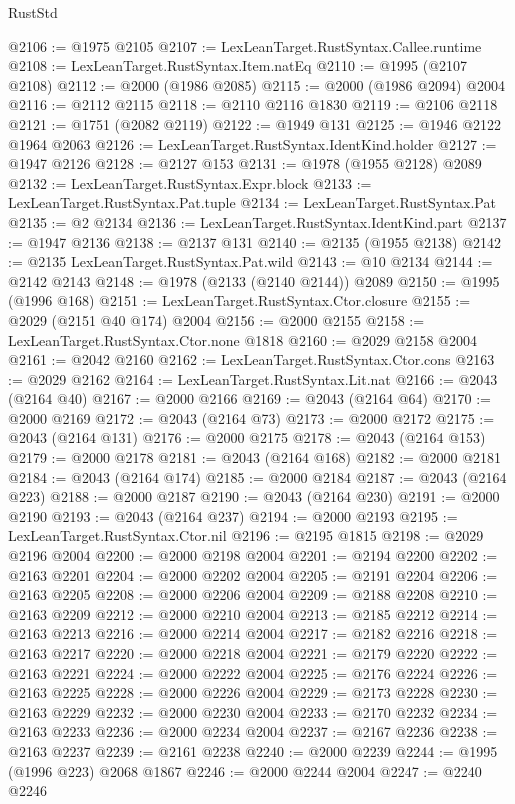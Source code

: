 \begin{lexlean}{RustStd}
\begin{coremodule}
@2106 := @1975 @2105
@2107 := LexLeanTarget.RustSyntax.Callee.runtime
@2108 := LexLeanTarget.RustSyntax.Item.natEq
@2110 := @1995 (@2107 @2108)
@2112 := @2000 (@1986 @2085)
@2115 := @2000 (@1986 @2094) @2004
@2116 := @2112 @2115
@2118 := @2110 @2116 @1830
@2119 := @2106 @2118
@2121 := @1751 (@2082 @2119)
@2122 := @1949 @131
@2125 := @1946 @2122 @1964 @2063
@2126 := LexLeanTarget.RustSyntax.IdentKind.holder
@2127 := @1947 @2126
@2128 := @2127 @153
@2131 := @1978 (@1955 @2128) @2089
@2132 := LexLeanTarget.RustSyntax.Expr.block
@2133 := LexLeanTarget.RustSyntax.Pat.tuple
@2134 := LexLeanTarget.RustSyntax.Pat
@2135 := @2 @2134
@2136 := LexLeanTarget.RustSyntax.IdentKind.part
@2137 := @1947 @2136
@2138 := @2137 @131
@2140 := @2135 (@1955 @2138)
@2142 := @2135 LexLeanTarget.RustSyntax.Pat.wild
@2143 := @10 @2134
@2144 := @2142 @2143
@2148 := @1978 (@2133 (@2140 @2144)) @2089
@2150 := @1995 (@1996 @168)
@2151 := LexLeanTarget.RustSyntax.Ctor.closure
@2155 := @2029 (@2151 @40 @174) @2004
@2156 := @2000 @2155
@2158 := LexLeanTarget.RustSyntax.Ctor.none @1818
@2160 := @2029 @2158 @2004
@2161 := @2042 @2160
@2162 := LexLeanTarget.RustSyntax.Ctor.cons
@2163 := @2029 @2162
@2164 := LexLeanTarget.RustSyntax.Lit.nat
@2166 := @2043 (@2164 @40)
@2167 := @2000 @2166
@2169 := @2043 (@2164 @64)
@2170 := @2000 @2169
@2172 := @2043 (@2164 @73)
@2173 := @2000 @2172
@2175 := @2043 (@2164 @131)
@2176 := @2000 @2175
@2178 := @2043 (@2164 @153)
@2179 := @2000 @2178
@2181 := @2043 (@2164 @168)
@2182 := @2000 @2181
@2184 := @2043 (@2164 @174)
@2185 := @2000 @2184
@2187 := @2043 (@2164 @223)
@2188 := @2000 @2187
@2190 := @2043 (@2164 @230)
@2191 := @2000 @2190
@2193 := @2043 (@2164 @237)
@2194 := @2000 @2193
@2195 := LexLeanTarget.RustSyntax.Ctor.nil
@2196 := @2195 @1815
@2198 := @2029 @2196 @2004
@2200 := @2000 @2198 @2004
@2201 := @2194 @2200
@2202 := @2163 @2201
@2204 := @2000 @2202 @2004
@2205 := @2191 @2204
@2206 := @2163 @2205
@2208 := @2000 @2206 @2004
@2209 := @2188 @2208
@2210 := @2163 @2209
@2212 := @2000 @2210 @2004
@2213 := @2185 @2212
@2214 := @2163 @2213
@2216 := @2000 @2214 @2004
@2217 := @2182 @2216
@2218 := @2163 @2217
@2220 := @2000 @2218 @2004
@2221 := @2179 @2220
@2222 := @2163 @2221
@2224 := @2000 @2222 @2004
@2225 := @2176 @2224
@2226 := @2163 @2225
@2228 := @2000 @2226 @2004
@2229 := @2173 @2228
@2230 := @2163 @2229
@2232 := @2000 @2230 @2004
@2233 := @2170 @2232
@2234 := @2163 @2233
@2236 := @2000 @2234 @2004
@2237 := @2167 @2236
@2238 := @2163 @2237
@2239 := @2161 @2238
@2240 := @2000 @2239
@2244 := @1995 (@1996 @223) @2068 @1867
@2246 := @2000 @2244 @2004
@2247 := @2240 @2246

\end{coremodule}
\end{lexlean}
